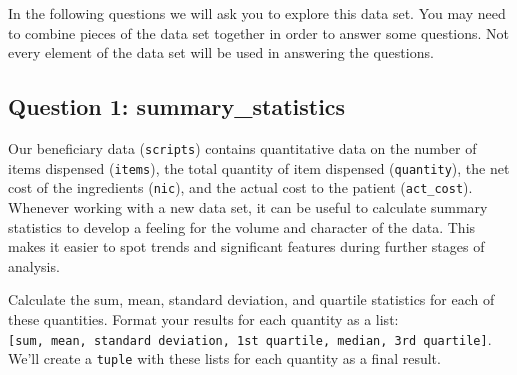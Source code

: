 \documentclass[11pt]{article}
\begin{document}
    In the following questions we will ask you to explore this data set. You
may need to combine pieces of the data set together in order to answer
some questions. Not every element of the data set will be used in
answering the questions.

    \hypertarget{question-1-summary_statistics}{%
\subsection{Question 1:
summary\_statistics}\label{question-1-summary_statistics}}

Our beneficiary data (\texttt{scripts}) contains quantitative data on
the number of items dispensed
(\texttt{\textquotesingle{}items\textquotesingle{}}), the total quantity
of item dispensed
(\texttt{\textquotesingle{}quantity\textquotesingle{}}), the net cost of
the ingredients (\texttt{\textquotesingle{}nic\textquotesingle{}}), and
the actual cost to the patient
(\texttt{\textquotesingle{}act\_cost\textquotesingle{}}). Whenever
working with a new data set, it can be useful to calculate summary
statistics to develop a feeling for the volume and character of the
data. This makes it easier to spot trends and significant features
during further stages of analysis.

Calculate the sum, mean, standard deviation, and quartile statistics for
each of these quantities. Format your results for each quantity as a
list:
\texttt{{[}sum,\ mean,\ standard\ deviation,\ 1st\ quartile,\ median,\ 3rd\ quartile{]}}.
We'll create a \texttt{tuple} with these lists for each quantity as a
final result.
\end{document}
